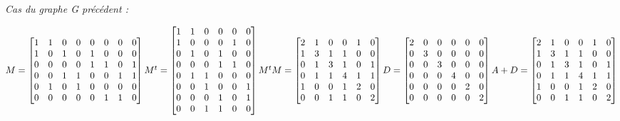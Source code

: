 \documentclass{article}
\begin{document}
\textit{Cas du graphe G précédent :}
\begin{center}
	$
	M =
	\left[\begin{matrix}
	1&1&0&0&0&0&0&0\\
	1&0&1&0&1&0&0&0\\
	0&0&0&0&1&1&0&1\\
	0&0&1&1&0&0&1&1\\
	0&1&0&1&0&0&0&0\\
	0&0&0&0&0&1&1&0
	\end{matrix}\right]
	\linebreak
	M^t =
	\left[\begin{matrix}
		1&1&0&0&0&0\\
		1&0&0&0&1&0\\
		0&1&0&1&0&0\\
		0&0&0&1&1&0\\
		0&1&1&0&0&0\\
		0&0&1&0&0&1\\
		0&0&0&1&0&1\\
		0&0&1&1&0&0
	\end{matrix}\right]
	\linebreak
	M^tM = 
	\left[\begin{matrix}
		2&1&0&0&1&0\\
		1&3&1&1&0&0\\
		0&1&3&1&0&1\\
		0&1&1&4&1&1\\
		1&0&0&1&2&0\\
		0&0&1&1&0&2
	\end{matrix}\right]
	\linebreak
	D =
	\left[\begin{matrix}
		2&0&0&0&0&0\\
		0&3&0&0&0&0\\
		0&0&3&0&0&0\\
		0&0&0&4&0&0\\
		0&0&0&0&2&0\\
		0&0&0&0&0&2
	\end{matrix}\right]
	\linebreak
	A + D =
	\left[\begin{matrix}
		2&1&0&0&1&0\\
		1&3&1&1&0&0\\
		0&1&3&1&0&1\\
		0&1&1&4&1&1\\
		1&0&0&1&2&0\\
		0&0&1&1&0&2
	\end{matrix}\right]
	$
\end{center}
\end{document}
